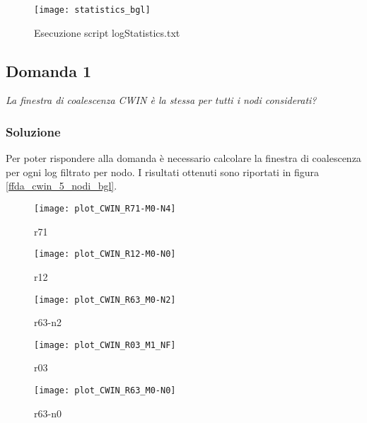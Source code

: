 \begin{figure}[!htbp]
  \centering
  \texttt{[image: statistics\_bgl]}
  \caption{Esecuzione script logStatistics.txt}
  \label{ffda_statistics_bgl}
\end{figure}

\clearpage

\subsection{Domanda 1}
\textit{La finestra di coalescenza CWIN è la stessa per tutti i nodi considerati?}

\subsubsection*{Soluzione}
Per poter rispondere alla domanda è necessario calcolare la finestra di coalescenza
per ogni log filtrato per nodo.
I risultati ottenuti sono riportati in figura \ref{ffda_cwin_5_nodi_bgl}.\\

\begin{minipage}{\linewidth}
  \centering
  \begin{minipage}{0.49\linewidth}
    \begin{figure}[H]
      \texttt{[image: plot\_CWIN\_R71-M0-N4]}
      \caption*{r71}
    \end{figure}
  \end{minipage}
  \begin{minipage}{0.49\linewidth}
    \begin{figure}[H]
      \texttt{[image: plot\_CWIN\_R12-M0-N0]}
      \caption*{r12}
    \end{figure}
  \end{minipage}
  \begin{minipage}{0.49\linewidth}
    \begin{figure}[H]
      \texttt{[image: plot\_CWIN\_R63\_M0-N2]}
      \caption*{r63-n2}
    \end{figure}
  \end{minipage}
  \begin{minipage}{0.49\linewidth}
    \begin{figure}[H]
      \centering
      \texttt{[image: plot\_CWIN\_R03\_M1\_NF]}
      \caption*{r03}
    \end{figure}
  \end{minipage}
  \begin{minipage}{0.49\linewidth}
    \hspace{0.25\linewidth}
    \begin{figure}[H]
      \texttt{[image: plot\_CWIN\_R63\_M0-N0]}
      \caption*{r63-n0}
    \end{figure}
  \end{minipage}
\end{minipage}
\label{ffda_cwin_5_nodi_bgl}

